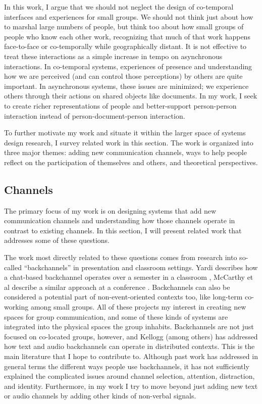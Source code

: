 \documentclass{tufte-handout}
\begin{document}
In this work, I argue that we should not neglect the design of co-temporal interfaces and experiences for small groups. We should not think just about how to marshal large numbers of people, but think too about how small groups of people who know each other work, recognizing that much of that work happens face-to-face or co-temporally while geographically distant. It is not effective to treat these interactions as a simple increase in tempo on asynchronous interactions. In co-temporal systems, experiences of presence and understanding how we are perceived (and can control those perceptions) by others are quite important. In asynchronous systems, these issues are minimized; we experience others through their actions on shared objects like documents. In my work, I seek to create richer representations of people and better-support person-person interaction instead of person-document-person interaction. 

To further motivate my work and situate it within the larger space of systems design research, I survey related work in this section. The work is organized into three major themes: adding new communication channels, ways to help people reflect on the participation of themselves and others, and theoretical perspectives.


\subsection{Channels}

The primary focus of my work is on designing systems that add new communication channels and understanding how those channels operate in contrast to existing channels. In this section, I will present related work that addresses some of these questions.

The work most directly related to these questions comes from research into so-called ``backchannels'' in presentation and classroom settings. Yardi describes how a chat-based backchannel operates over a semester in a classroom \citep{Yardi:2006uk}, McCarthy et al describe a similar approach at a conference \citep{mccarthy_digital_2004}. Backchannels can also be considered a potential part of non-event-oriented contexts too, like long-term co-working among small groups. \citep{Huang:2003ef} All of these projects my interest in creating new spaces for group communication, and some of these kinds of systems are integrated into the physical spaces the group inhabits. Backchannels are not just focused on co-located groups, however, and Kellogg (among others) \citep{kellogg_leveraging_2006} \citep{Yankelovich:2005bx} has addressed how text and audio backchannels can operate in distributed contexts. This is the main literature that I hope to contribute to. Although past work has addressed in general terms the different ways people use backchannels, it has not sufficiently explained the complicated issues around channel selection, attention, distraction, and identity. Furthermore, in my work I try to move beyond just adding new text or audio channels by adding other kinds of non-verbal signals.
\end{document}
